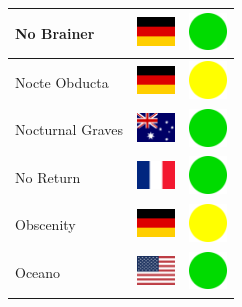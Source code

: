 \documentclass[12pt, a4paper, twoside]{report}
\begin{document}
\begin{center}
\begin{longtable}{|p{5cm}|p{2cm}|p{2cm}|}
No Brainer & \includegraphics[width=1cm]{4x3/de} & \includegraphics[width=1cm]{likes/y} \\ \hline
Nocte Obducta & \includegraphics[width=1cm]{4x3/de} & \includegraphics[width=1cm]{likes/m} \\ \hline
Nocturnal Graves & \includegraphics[width=1cm]{4x3/au} & \includegraphics[width=1cm]{likes/y} \\ \hline
No Return & \includegraphics[width=1cm]{4x3/fr} & \includegraphics[width=1cm]{likes/y} \\ \hline
Obscenity & \includegraphics[width=1cm]{4x3/de} & \includegraphics[width=1cm]{likes/m} \\ \hline
Oceano & \includegraphics[width=1cm]{4x3/us} & \includegraphics[width=1cm]{likes/y} \\ \hline

\end{longtable}
\end{center}
\end{document}
